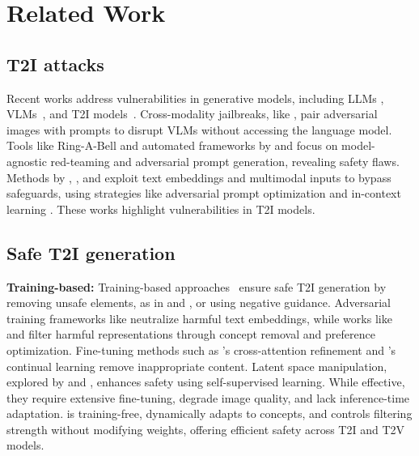 \section{Related Work}
\subsection{T2I attacks}
Recent works address vulnerabilities in generative models, including LLMs \citep{zou2023universal, patilcan,wei2023jailbroken, liu2024rethinking}, VLMs~\citep{zhao2024evaluating, zong2024safety,patil2024unlearning}, and T2I models~\citep{yang2024guardt2i,wang2024t2ishield,li2024safegen}. Cross-modality jailbreaks, like \citet{shayegani2023jailbreak}, pair adversarial images with prompts to disrupt VLMs without accessing the language model.
Tools like Ring-A-Bell \citep{tsai2024ring} and automated frameworks by \citet{kim2024automatic} and \citet{li2024art} focus on model-agnostic red-teaming and adversarial prompt generation, revealing safety flaws. Methods by \citet{ma2024jailbreaking}, \citet{yang2024mma}, and \citet{mehrabi2023flirt} exploit text embeddings and multimodal inputs to bypass safeguards, using strategies like adversarial prompt optimization and in-context learning \citep{chin2024prompting4debugging, liu2024groot}. These works highlight vulnerabilities in T2I models.


\subsection{Safe T2I generation}

{\bf Training-based:} Training-based approaches~\citep{lyu2024one,pham2024robust,zhang2024steerdiff} ensure safe T2I generation by removing unsafe elements, as in \citet{li2024safegen} and \citet{gandikota2023erasing}, or using negative guidance. Adversarial training frameworks like \citet{kim2024race} neutralize harmful text embeddings, while works like \citet{das2024espresso} and \citet{park2024direct} filter harmful representations through concept removal and preference optimization. Fine-tuning methods such as \citet{lu2024mace}'s cross-attention refinement and \citet{heng2023selective}'s continual learning remove inappropriate content. Latent space manipulation, explored by \citet{liu2024latent} and \citet{li2024self}, enhances safety using self-supervised learning. While effective, they require extensive fine-tuning, degrade image quality, and lack inference-time adaptation. \ours{} is training-free, dynamically adapts to concepts, and controls filtering strength without modifying weights, offering efficient safety across T2I and T2V models.

